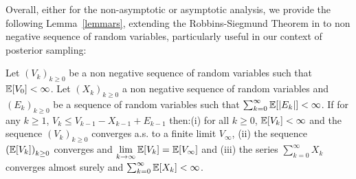 \documentclass[final,12pt]{alt2022} %
\begin{document}
Overall, either for the non-asymptotic or asymptotic analysis, we provide the following Lemma~\ref{lemmars}, extending the Robbins-Siegmund Theorem in \citet{robbins1971convergence} to non negative sequence of random variables, particularly useful in our context of posterior sampling:

\begin{lem}\label{lemmars}
Let $\left(V_k \right)_{k\geq0}$ be a non negative sequence of random variables such that $\EE[V_0] < \infty$. Let $\left(X_k \right)_{k\geq0}$ a non negative sequence of random variables and $\left(E_k \right)_{k \geq 0}$ be a sequence of random variables such that $\sum_{k=0}^{\infty}{\EE[|E_k|]} < \infty$. If for any $k \geq 1$, $V_{k} \leq V_{k-1} - X_{k-1} + E_{k-1}$  then:(i) for all $k \geq 0$, $\EE[V_k] < \infty$ and the sequence $\left(V_k \right)_{k\geq0}$  converges a.s. to a finite limit $V_{\infty}$, (ii) the sequence $\left(\EE[V_k] \right)_{k\geq0}$ converges and $\lim \limits_{k \to \infty}\EE[V_k] = \EE[V_{\infty}] $ and (iii) the series $\sum_{k=0}^{\infty}{X_k}$ converges almost surely and $\sum_{k=0}^{\infty}{\EE[X_k]}< \infty$.
\end{lem}
\end{document}
